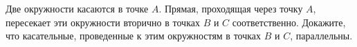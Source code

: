\begin{ex}
	\begin{condition}
		Две окружности касаются в точке \( A \). Прямая, проходящая через точку \( A \), пересекает эти окружности вторично	в точках \( B  \) и \( C  \) соответственно. Докажите, что касательные,	проведенные к этим окружностям в точках \( B  \) и \( C \), параллельны.
	\end{condition}
\end{ex}